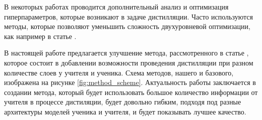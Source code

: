 В некоторых работах \cite{gorpinich2022gradient}  проводится дополнительный анализ и оптимизация гиперпараметров,
которые возникают в задаче дистилляции. Часто используются методы, которые позволяют уменьшить сложность двухуровневой оптимизации,
как например в статье \cite{darts}.

В настоящей работе предлагается улучшение метода, рассмотренного в статье \cite{Ahn_2019_CVPR},
которое состоит в добавлении возможности проведения дистилляции при разном количестве слоев у учителя и ученика.
Схема методов, нашего и базового, изображена на рисунке \ref{fig:method_scheme}.
Актуальность работы заключается в создании метода, который будет использовать большое количество информации от учителя в процессе дистиляции,
будет довольно гибким, подходя под разные архитектуры моделей ученика и учителя, и будет показывать лучшее качество.
